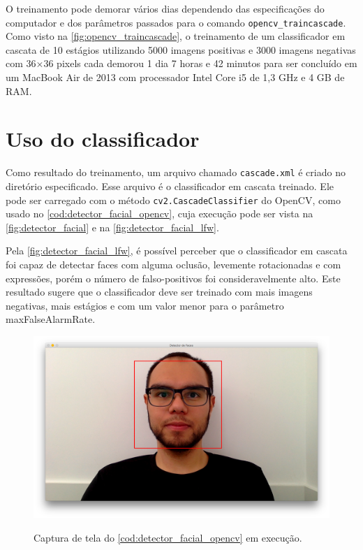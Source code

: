 O treinamento pode demorar vários dias dependendo das especificações do computador e dos parâmetros passados para o comando \texttt{opencv\_traincascade}.
Como visto na \autoref{fig:opencv_traincascade}, o treinamento de um classificador em cascata de 10 estágios utilizando 5000 imagens positivas e 3000 imagens negativas com 36$\times$36 pixels cada demorou 1 dia 7 horas e 42 minutos para ser concluído em um MacBook Air de 2013 com processador Intel Core i5 de 1,3 GHz e 4 GB de RAM.


\section{Uso do classificador}\label{sec:uso_classificador}

Como resultado do treinamento, um arquivo chamado \texttt{cascade.xml} é criado no diretório especificado. Esse arquivo é o classificador em cascata treinado.
Ele pode ser carregado com o método \texttt{cv2.CascadeClassifier} do OpenCV, como usado no \autoref{cod:detector_facial_opencv}, cuja execução pode ser vista na \autoref{fig:detector_facial} e na \autoref{fig:detector_facial_lfw}.

Pela \autoref{fig:detector_facial_lfw}, é possível perceber que o classificador em cascata foi capaz de detectar faces com alguma oclusão, levemente rotacionadas e com expressões, porém o número de falso-positivos foi consideravelmente alto. Este resultado sugere que o classificador deve ser treinado com mais imagens negativas, mais estágios e com um valor menor para o parâmetro maxFalseAlarmRate.

\begin{figure}[htbp]
    \caption{Captura de tela do \autoref{cod:detector_facial_opencv} em execução.}
    \label{fig:detector_facial}
    \begin{center}
        {\includegraphics[width=0.4\linewidth]{imagens/detector_facial.png}}
    \end{center}
\end{figure}

